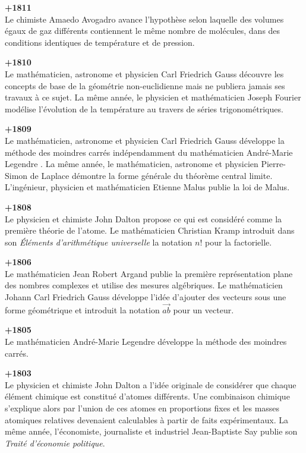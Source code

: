 \textbf{+1811}\\
Le chimiste Amaedo Avogadro avance l'hypothèse selon laquelle des volumes égaux de gaz différents contiennent le même nombre de molécules, dans des conditions identiques de température et de pression.

\textbf{+1810}\\
Le mathématicien, astronome et physicien Carl Friedrich Gauss découvre les concepts de base de la géométrie non-euclidienne mais ne publiera jamais ses travaux à ce sujet. La même année, le physicien et mathématicien Joseph Fourier modélise l'évolution de la température au travers de séries trigonométriques.

\textbf{+1809}\\
Le mathématicien, astronome et physicien Carl Friedrich Gauss développe la méthode des moindres carrés indépendamment du mathématicien André-Marie Legendre . La même année, le mathématicien, astronome et physicien Pierre-Simon de Laplace démontre la forme générale du théorème central limite. L'ingénieur, physicien et mathématicien Etienne Malus publie la loi de Malus.

\textbf{+1808}\\
Le physicien et chimiste John Dalton propose ce qui est considéré comme la première théorie de l'atome. Le mathématicien Christian Kramp introduit dans son \textit{Éléments d'arithmétique universelle} la notation $n!$ pour la factorielle.

\textbf{+1806}\\
Le mathématicien Jean Robert Argand publie la première représentation plane des nombres complexes et utilise des mesures algébriques. Le mathématicien Johann Carl Friedrich Gauss développe l'idée d'ajouter des vecteurs sous une forme géométrique et introduit la notation $\overrightarrow{ab}$ pour un vecteur.

\textbf{+1805}\\
Le mathématicien André-Marie Legendre développe la méthode des moindres carrés.

\textbf{+1803}\\
Le physicien et chimiste John Dalton a l'idée originale de considérer que chaque élément chimique est constitué d'atomes différents. Une combinaison chimique s'explique alors par l'union de ces atomes en proportions fixes et les masses atomiques relatives devenaient calculables à partir de faits expérimentaux. La même année, l'économiste, journaliste et industriel Jean-Baptiste Say publie son \textit{Traité d'économie politique}.

